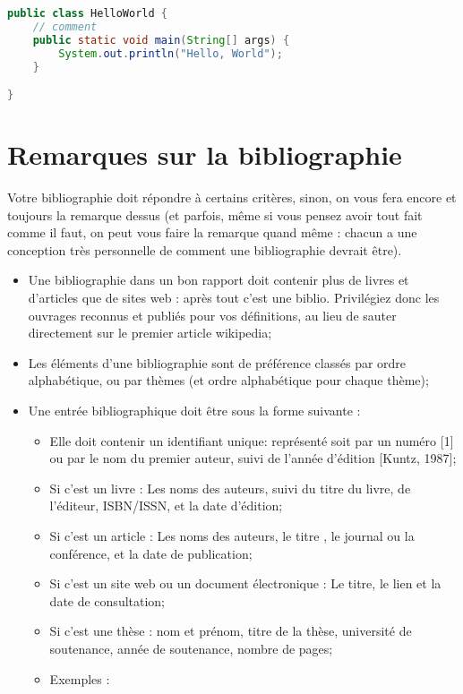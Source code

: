\begin{spacing}{1.2}
\begin{lstlisting}[label=code:java,caption=Helloworld Java,language=java]
	public class HelloWorld {
    // comment
    public static void main(String[] args) {
        System.out.println("Hello, World");
    }

}
\end{lstlisting}

\section{Remarques sur la bibliographie}
Votre bibliographie doit répondre à certains critères, sinon, on vous fera encore et
toujours la remarque dessus (et parfois, même si vous pensez avoir tout fait comme il
 faut, on peut vous faire la remarque quand même : chacun a une conception très
personnelle de comment une bibliographie devrait être).\\
\begin{itemize}
\item Une bibliographie dans un bon rapport doit contenir plus de livres et d'articles 
que de sites web : après tout c'est une biblio. Privilégiez donc les ouvrages
reconnus et publiés pour vos définitions, au lieu de sauter directement sur le premier article wikipedia;
 \item Les éléments d'une bibliographie sont de préférence classés par ordre
alphabétique, ou par thèmes (et ordre alphabétique pour chaque thème);
\item Une entrée bibliographique doit être sous la forme suivante :
\begin{itemize}
\item Elle doit contenir un identifiant unique: représenté soit par un numéro
[1] ou par le nom du premier auteur, suivi de l'année d'édition [Kuntz, 1987];
\item Si c'est un livre : Les noms des auteurs, suivi du titre du livre, de l'éditeur, 
ISBN/ISSN, et la date d'édition;
\item Si c'est un article : Les noms des auteurs, le titre , le journal ou la
conférence, et la date de publication;
\item Si c'est un site web ou un document électronique : Le titre, le lien et la date 
de consultation;
\item Si c'est une thèse : nom et prénom, titre de la thèse, université de
soutenance, année de soutenance, nombre de pages;
\item Exemples : 
\begin{description}

\end{description}
\end{itemize}
\end{itemize}
\end{spacing}
